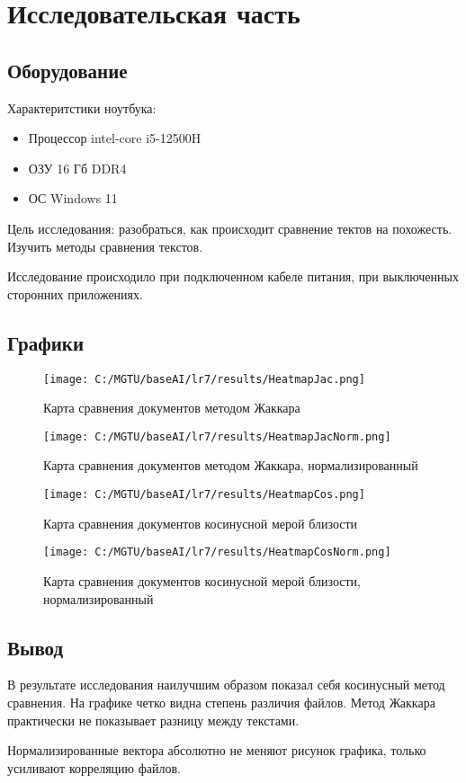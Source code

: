 \chapter{Исследовательская часть}

\section{Оборудование}

Характеритстики ноутбука:
\begin{itemize}
	\item Процессор intel-core i5-12500H
	\item ОЗУ 16 Гб DDR4
	\item ОС Windows 11
\end{itemize}

Цель исследования: разобраться, как происходит сравнение тектов на похожесть. Изучить методы сравнения текстов.

Исследование происходило при подключенном кабеле питания, при выключенных сторонних приложениях.

\section{Графики}

\begin{figure}[H]
    \texttt{[image: C:/MGTU/baseAI/lr7/results/HeatmapJac.png]}
    \caption{Карта сравнения документов методом Жаккара}
    \label{fig:one}
\end{figure}

\begin{figure}[H]
    \texttt{[image: C:/MGTU/baseAI/lr7/results/HeatmapJacNorm.png]}
    \caption{Карта сравнения документов методом Жаккара, нормализированный}
    \label{fig:one}
\end{figure}

\begin{figure}[H]
    \texttt{[image: C:/MGTU/baseAI/lr7/results/HeatmapCos.png]}
    \caption{Карта сравнения документов косинусной мерой близости}
    \label{fig:one}
\end{figure}

\begin{figure}[H]
    \texttt{[image: C:/MGTU/baseAI/lr7/results/HeatmapCosNorm.png]}
    \caption{Карта сравнения документов  косинусной мерой близости, нормализированный}
    \label{fig:one}
\end{figure}

\section{Вывод}

В результате исследования наилучшим образом показал себя косинусный метод сравнения. На графике четко видна степень различия файлов.
Метод Жаккара практически не показывает разницу между текстами.

Нормализированные вектора абсолютно не меняют рисунок графика, только усиливают корреляцию файлов.

\clearpage
